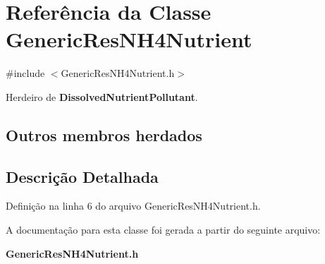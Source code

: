\section{Referência da Classe Generic\+Res\+N\+H4\+Nutrient}
\label{class_generic_res_n_h4_nutrient}


{\ttfamily \#include $<$Generic\+Res\+N\+H4\+Nutrient.\+h$>$}



Herdeiro de {\bf Dissolved\+Nutrient\+Pollutant}.

\subsection*{Outros membros herdados}


\subsection{Descrição Detalhada}


Definição na linha 6 do arquivo Generic\+Res\+N\+H4\+Nutrient.\+h.



A documentação para esta classe foi gerada a partir do seguinte arquivo\+:\begin{DoxyCompactItemize}
\item 
{\bf Generic\+Res\+N\+H4\+Nutrient.\+h}\end{DoxyCompactItemize}
